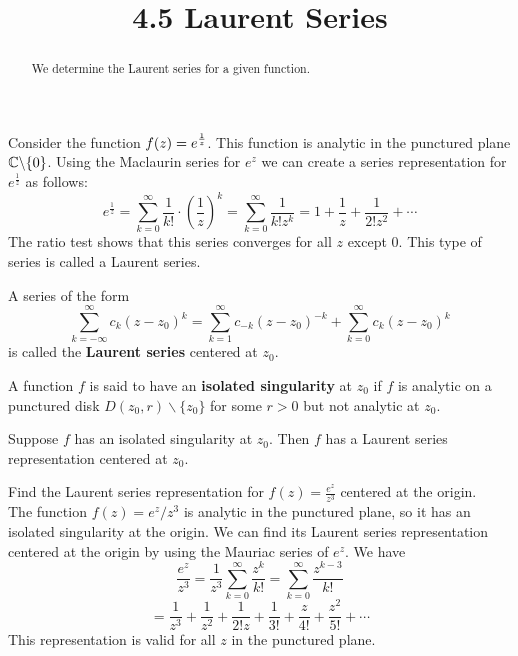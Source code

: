 \documentclass[handout]{ximera}
\title{4.5 Laurent Series}
\begin{document}
\begin{abstract}
We determine the Laurent series for a given function.
\end{abstract}

\maketitle

Consider the function $\displaystyle f(z) = e^\frac{1}{z}$. This function is analytic in the punctured plane $\mathbb C\backslash\{0\}$.
Using the Maclaurin series for $e^z$ we can create a series representation for $e^\frac{1}{z}$ as follows:
\[
e^\frac{1}{z} = \sum_{k=0}^\infty \frac{1}{k!} \cdot \left(\frac{1}{z}\right)^k = \sum_{k=0}^\infty \frac{1}{k!z^k} = 1+ \frac{1}{z} + \frac{1}{2! z^2} + \cdots
\]
 The ratio test shows that this series converges for all $z$ except $0$. This type of series is called a Laurent series.
 

\begin{definition} 
A series of the form 
\[
\sum_{k=-\infty}^\infty c_k(z-z_0)^k = \sum_{k=1}^\infty c_{-k}(z-z_0)^{-k} + \sum_{k=0}^\infty c_k(z-z_0)^k
\]
is called the \textbf{Laurent series} centered at $z_0$.
\end{definition}

\begin{definition}
A function $f$ is said to have an \textbf{isolated singularity} at $z_0$ if $f$ is analytic on a punctured disk $D(z_0, r)\backslash\{z_0\}$ for some $r>0$
but not analytic at $z_0$.
\end{definition}

\begin{theorem}
Suppose $f$ has an isolated singularity at $z_0$. Then $f$ has a Laurent series representation centered at $z_0$.
\end{theorem}

\begin{example}[example 1]
Find the Laurent series representation for $f(z) = \frac{e^z}{z^3}$ centered at the origin.\\
The function $f(z) = e^z/z^3$ is analytic in the punctured plane, so it has an isolated singularity at the origin.
We can find its Laurent series representation centered at the origin by using the Mauriac series of $e^z$.
We have
\[
\frac{e^z}{z^3} = \frac{1}{z^3} \sum_{k=0}^\infty \frac{z^k}{k!} = \sum_{k=0}^\infty \frac{z^{k-3}}{k!} 
\]
\[
= \frac{1}{z^3} + \frac{1}{z^2} + \frac{1}{2!z} + \frac{1}{3!} + \frac{z}{4!} + \frac{z^2}{5!} + \cdots
\]
This representation is valid for all $z$ in the punctured plane.
\end{example}
\end{document}
